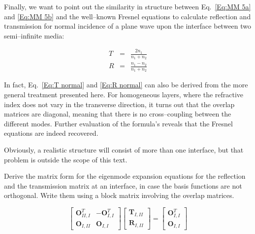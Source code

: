 Finally, we want to point out the similarity in structure between Eq.~\ref{Eq:MM 5a} and \ref{Eq:MM 5b} and the well--known Fresnel equations to calculate reflection and transmission for normal incidence of a plane wave upon the interface between two semi--infinite media:

\begin{eqnarray}
T & = & \frac{2n_{1}}{n_{1}+n_{2}}\label{Eq:T normal} \\
R & = & \frac{n_{1}-n_{2}}{n_{1}+n_{2}}\label{Eq:R normal} 
\end{eqnarray}

In fact, Eq.~\ref{Eq:T normal} and \ref{Eq:R normal} can also be derived from the more general treatment presented here. For homogeneous layers, where the refractive index does not vary in the transverse direction, it turns out that the overlap matrices are diagonal, meaning that there is no cross--coupling between the different modes. Further evaluation of the formula's reveals that the Fresnel equations are indeed recovered.

Obviously, a realistic structure will consist of more than one interface, but that problem is outside the scope of this text.


\begin{exer}
Derive the matrix form for the eigenmode expansion equations for the reflection and the transmission matrix at an interface, in case the basis functions are not orthogonal. Write them using a block matrix involving the overlap matrices.

\begin{sol}
$$ \begin{bmatrix} \mathbf{O}^{T}_{II,I} & -\mathbf{O}^{T}_{I,I} \\ \mathbf{O}_{I,II} & \mathbf{O}_{I,I} \end{bmatrix} \begin{bmatrix} \mathbf{T}_{I,II} \\ \mathbf{R}_{I,II} \end{bmatrix} =  \begin{bmatrix} \mathbf{O}^{T}_{I,I} \\ \mathbf{O}_{I,I} \end{bmatrix} $$
\end{sol}

\end{exer}


\pagebreak




